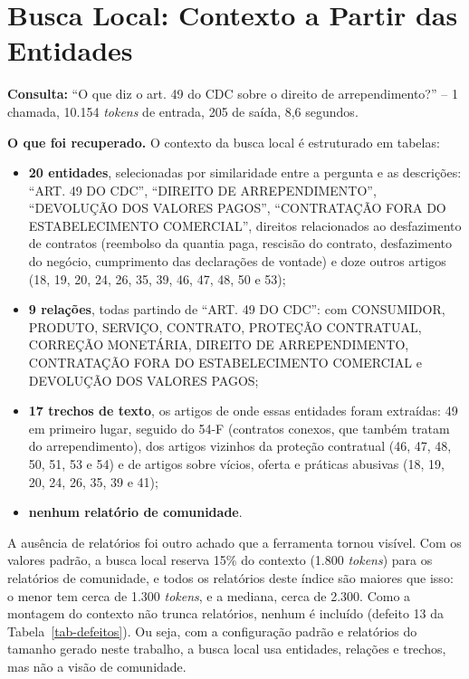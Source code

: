 \section{Busca Local: Contexto a Partir das Entidades}
\label{sec-analise-local}

\textbf{Consulta:} ``O que diz o art. 49 do CDC sobre o direito de arrependimento?'' -- 1 chamada, 10.154 \textit{tokens} de entrada, 205 de saída, 8,6 segundos.

\textbf{O que foi recuperado.} O contexto da busca local é estruturado em tabelas:

\begin{itemize}
    \item \textbf{20 entidades}, selecionadas por similaridade entre a pergunta e as descrições: ``ART. 49 DO CDC'', ``DIREITO DE ARREPENDIMENTO'', ``DEVOLUÇÃO DOS VALORES PAGOS'', ``CONTRATAÇÃO FORA DO ESTABELECIMENTO COMERCIAL'', direitos relacionados ao desfazimento de contratos (reembolso da quantia paga, rescisão do contrato, desfazimento do negócio, cumprimento das declarações de vontade) e doze outros artigos (18, 19, 20, 24, 26, 35, 39, 46, 47, 48, 50 e 53);
    \item \textbf{9 relações}, todas partindo de ``ART. 49 DO CDC'': com CONSUMIDOR, PRODUTO, SERVIÇO, CONTRATO, PROTEÇÃO CONTRATUAL, CORREÇÃO MONETÁRIA, DIREITO DE ARREPENDIMENTO, CONTRATAÇÃO FORA DO ESTABELECIMENTO COMERCIAL e DEVOLUÇÃO DOS VALORES PAGOS;
    \item \textbf{17 trechos de texto}, os artigos de onde essas entidades foram extraídas: 49 em primeiro lugar, seguido do 54-F (contratos conexos, que também tratam do arrependimento), dos artigos vizinhos da proteção contratual (46, 47, 48, 50, 51, 53 e 54) e de artigos sobre vícios, oferta e práticas abusivas (18, 19, 20, 24, 26, 35, 39 e 41);
    \item \textbf{nenhum relatório de comunidade}.
\end{itemize}

A ausência de relatórios foi outro achado que a ferramenta tornou visível. Com os valores padrão, a busca local reserva 15\% do contexto (1.800 \textit{tokens}) para os relatórios de comunidade, e todos os relatórios deste índice são maiores que isso: o menor tem cerca de 1.300 \textit{tokens}, e a mediana, cerca de 2.300. Como a montagem do contexto não trunca relatórios, nenhum é incluído (defeito 13 da Tabela~\ref{tab-defeitos}). Ou seja, com a configuração padrão e relatórios do tamanho gerado neste trabalho, a busca local usa entidades, relações e trechos, mas não a visão de comunidade.

